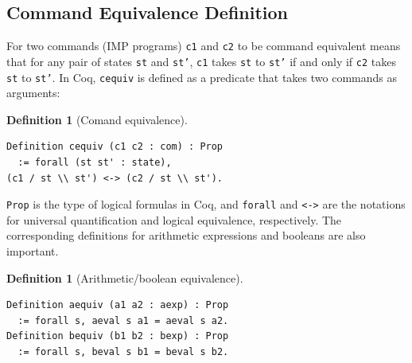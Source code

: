 \documentclass[compsoc,conference,a4paper,10pt,times]{IEEEtran}
\newtheorem{defin}[theorem]{Definition}
\begin{document}




\subsection{Command Equivalence Definition}\label{commequiv} 
    For two commands (IMP programs) \texttt{c1} and \texttt{c2} to be command equivalent means that for any pair of states \texttt{st} and \texttt{st'}, \texttt{c1} takes \texttt{st} to \texttt{st'} if and only if \texttt{c2} takes \texttt{st} to \texttt{st'}.  In Coq, \texttt{cequiv}\cite{SFV2}  is defined as a predicate that takes two commands as arguments:
\begin{defin}[Comand equivalence]\label{def:cequiv}
\begin{verbatim}
Definition cequiv (c1 c2 : com) : Prop 
  := forall (st st' : state), 
(c1 / st \\ st') <-> (c2 / st \\ st').
\end{verbatim}
\end{defin}
\texttt{Prop} is the type of logical formulas in Coq, and \texttt{forall} and \texttt{<->} are the notations for universal quantification and logical equivalence, respectively. The corresponding definitions for arithmetic expressions and booleans are also important.
\begin{defin}[Arithmetic/boolean equivalence]
\begin{verbatim}
Definition aequiv (a1 a2 : aexp) : Prop
  := forall s, aeval s a1 = aeval s a2.
Definition bequiv (b1 b2 : bexp) : Prop
  := forall s, beval s b1 = beval s b2.
\end{verbatim}
\end{defin}
\end{document}
